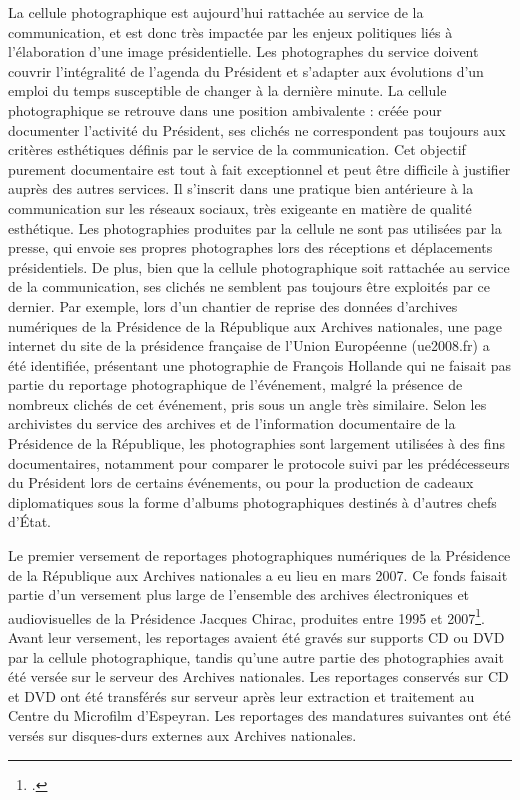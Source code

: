 La cellule photographique est aujourd’hui rattachée au service de la communication, et est donc très impactée par les enjeux politiques liés à l'élaboration d'une image présidentielle. Les photographes du service doivent couvrir l’intégralité de l’agenda du Président et s’adapter aux évolutions d’un emploi du temps susceptible de changer à la dernière minute. La cellule photographique se retrouve dans une position ambivalente : créée pour documenter l’activité du Président, ses clichés ne correspondent pas toujours aux critères esthétiques définis par le service de la communication. Cet objectif purement documentaire est tout à fait exceptionnel et peut être difficile à justifier auprès des autres services. Il s’inscrit dans une pratique bien antérieure à la communication sur les réseaux sociaux, très exigeante en matière de qualité esthétique. Les photographies produites par la cellule ne sont pas utilisées par la presse, qui envoie ses propres photographes lors des réceptions et déplacements présidentiels. De plus, bien que la cellule photographique soit rattachée au service de la communication, ses clichés ne semblent pas toujours être exploités par ce dernier. Par exemple, lors d'un chantier de reprise des données d'archives numériques de la Présidence de la République aux Archives nationales, une page internet du site de la présidence française de l'Union Européenne (ue2008.fr) a été identifiée, présentant une photographie de François Hollande qui ne faisait pas partie du reportage photographique de l'événement, malgré la présence de nombreux clichés de cet événement, pris sous un angle très similaire. Selon les archivistes du service des archives et de l'information documentaire de la Présidence de la République, les photographies sont largement utilisées à des fins documentaires, notamment pour comparer le protocole suivi par les prédécesseurs du Président lors de certains événements, ou pour la production de cadeaux diplomatiques sous la forme d'albums photographiques destinés à d'autres chefs d'État.

Le premier versement de reportages photographiques numériques de la Présidence de la République aux Archives nationales a eu lieu en mars 2007. Ce fonds faisait partie d'un versement plus large de l'ensemble des archives électroniques et audiovisuelles de la Présidence Jacques Chirac, produites entre 1995 et 2007\footcite{perez-bastiePresidenceJacquesChirac2015}. Avant leur versement, les reportages avaient été gravés sur supports CD ou DVD par la cellule photographique, tandis qu'une autre partie des photographies avait été versée sur le serveur des Archives nationales. Les reportages conservés sur CD et DVD ont été transférés sur serveur après leur extraction et traitement au Centre du Microfilm d'Espeyran. Les reportages des mandatures suivantes ont été versés sur disques-durs externes aux Archives nationales.

